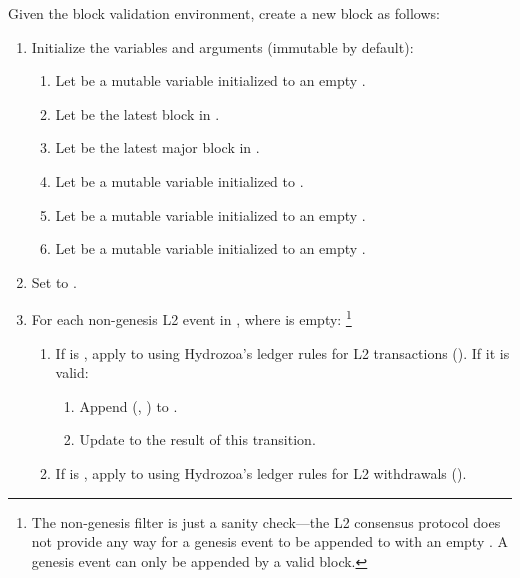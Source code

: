 \documentclass[../hydrozoa.tex]{subfiles}
\begin{document}
Given the block validation environment, create a new block as follows:
\begin{enumerate}
  \item Initialize the variables and arguments (immutable by default):
    \begin{enumerate}
      \item Let  be a mutable variable initialized to an empty .
      \item Let  be the latest block in .
      \item Let  be the latest major block in .
      \item Let  be a mutable variable initialized to .
      \item Let  be a mutable variable initialized to an empty .
      \item Let  be a mutable variable initialized to an empty .
    \end{enumerate}
  \item Set  to .
  \item For each non-genesis L2 event  in , where  is empty:%
    \footnote{The non-genesis filter is just a sanity check---the L2 consensus protocol does not provide any way for a genesis event to be appended to  with an empty .
      A genesis event can only be appended by a valid block.
      }
      \begin{enumerate}
        \item If  is , apply  to  using Hydrozoa's ledger rules for L2 transactions ().
          If it is valid:
          \begin{enumerate}
            \item Append (, ) to .
            \item Update  to the result of this transition.
          \end{enumerate}
        \item If  is , apply  to  using Hydrozoa's ledger rules for L2 withdrawals ().

\end{enumerate}
\end{enumerate}
\end{document}
